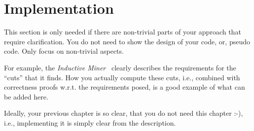 \chapter{Implementation}
\label{chap:impl}

This section is only needed if there are non-trivial parts of your approach that require clarification.
You do not need to show the design of your code, or, pseudo code.
Only focus on non-trivial aspects.

For example, the \emph{Inductive Miner}~\autocite{DBLP:conf/apn/LeemansFA13} clearly describes the requirements for the \enquote{cuts} that it finds.
How you actually compute these cuts, i.e., combined with correctness proofs w.r.t. the requirements posed, is a good example of what can be added here.

Ideally, your previous chapter is so clear, that you do not need this chapter :-), i.e., implementing it is simply clear from the description.
